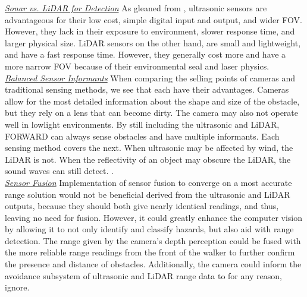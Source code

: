 \noindent \underline{\textit{Sonar vs. LiDAR for Detection}} As gleaned from \cite{sonar-vs-lidar}, ultrasonic sensors are advantageous for their low cost, simple digital input and output, and wider FOV. However, they lack in their exposure to environment, slower response time, and larger physical size. LiDAR sensors on the other hand, are small and lightweight, and have a fast response time. However, they generally cost more and have a more narrow FOV because of their environmental seal and laser physics.\\

\noindent \underline{\textit{Balanced Sensor Informants}} When comparing the selling points of cameras and traditional sensing methods, we see that each have their advantages. Cameras allow for the most detailed information about the shape and size of the obstacle, but they rely on a lens that can become dirty. The camera may also not operate well in lowlight environments. By still including the ultrasonic and LiDAR, FORWARD can always sense obstacles and have multiple informants. Each sensing method covers the next. When ultrasonic may be affected by wind, the LiDAR is not. When the reflectivity of an object may obscure the LiDAR, the sound waves can still detect. \cite{camera-vs-sensor}.\\

\noindent \underline{\textit{Sensor Fusion}} Implementation of sensor fusion to converge on a most accurate range solution would not be beneficial derived from the ultrasonic and LiDAR outputs, because they should both give nearly identical readings, and thus, leaving no need for fusion. However, it could greatly enhance the computer vision by allowing it to not only identify and classify hazards, but also aid with range detection. The range given by the camera's depth perception could be fused with the more reliable range readings from the front of the walker to further confirm the presence and distance of obstacles. Additionally, the camera could inform the avoidance subsystem of ultrasonic and LiDAR range data to for any reason, ignore.\\

